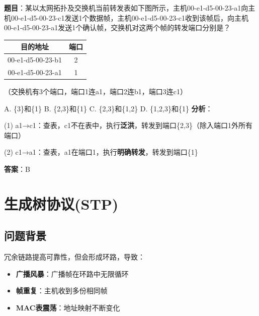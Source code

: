 \documentclass[12pt,a4paper,openany]{ctexbook}
\begin{document}
\begin{examplebox}[例题3.5d 2014年真题]
\textbf{题目}：某以太网拓扑及交换机当前转发表如下图所示，主机00-e1-d5-00-23-a1向主机00-e1-d5-00-23-c1发送1个数据帧，主机00-e1-d5-00-23-c1收到该帧后，向主机00-e1-d5-00-23-a1发送1个确认帧，交换机对这两个帧的转发端口分别是？

\begin{center}\small
\begin{tabular}{|c|c|}
\hline
目的地址 & 端口 \\
\hline
00-e1-d5-00-23-b1 & 2 \\
00-e1-d5-00-23-a1 & 1 \\
\hline
\end{tabular}
\end{center}
（交换机有3个端口，端口1连a1，端口2连b1，端口3连c1）

A. \{3\}和\{1\} \quad B. \{2,3\}和\{1\} \quad C. \{2,3\}和\{1,2\} \quad D. \{1,2,3\}和\{1\}
\tcblower
\textbf{分析}：

(1) a1→c1：查表，c1不在表中，执行\textbf{泛洪}，转发到端口\{2,3\}（除入端口1外所有端口）

(2) c1→a1：查表，a1在端口1，执行\textbf{明确转发}，转发到端口\{1\}

\textbf{答案}：B
\end{examplebox}


\section{生成树协议(STP)}
\subsection{问题背景}
冗余链路提高可靠性，但会形成环路，导致：
\begin{itemize}[leftmargin=2em,itemsep=0pt]
    \item \textbf{广播风暴}：广播帧在环路中无限循环
    \item \textbf{帧重复}：主机收到多份相同帧
    \item \textbf{MAC表震荡}：地址映射不断变化
\end{itemize}

\begin{center}
\end{center}
\end{document}
